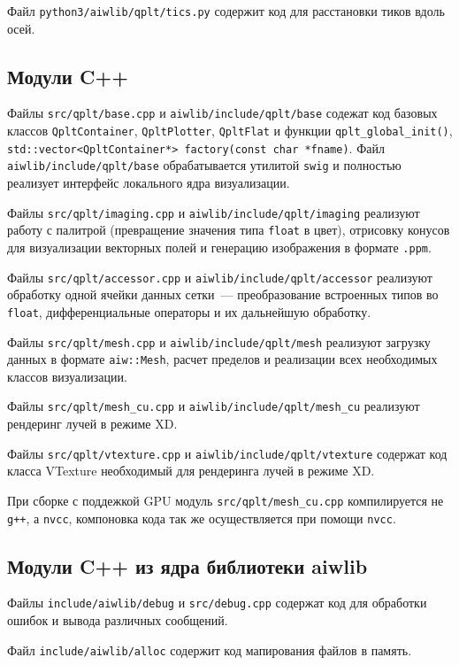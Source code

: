 \documentclass[12pt]{article}
\begin{document}
Файл \verb'python3/aiwlib/qplt/tics.py' содержит код для расстановки тиков вдоль осей.

\subsection{Модули C++}

Файлы \verb'src/qplt/base.cpp' и \verb'aiwlib/include/qplt/base' содежат код базовых классов \verb'QpltContainer',
\verb'QpltPlotter', \verb'QpltFlat' и функции \verb'qplt_global_init()', \verb'std::vector<QpltContainer*> factory(const char *fname)'.
Файл \verb'aiwlib/include/qplt/base' обрабатывается утилитой \verb'swig' и полностью реализует интерфейс локального ядра визуализации. 

Файлы \verb'src/qplt/imaging.cpp' и \verb'aiwlib/include/qplt/imaging' реализуют работу с палитрой (превращение значения типа \verb'float' в цвет),
отрисовку конусов для визуализации векторных полей и генерацию изображения в формате \verb'.ppm'.

Файлы \verb'src/qplt/accessor.cpp' и \verb'aiwlib/include/qplt/accessor' реализуют обработку одной ячейки данных сетки~--- преобразование
встроенных типов во \verb'float', дифференциальные операторы и их дальнейшую обработку. 

Файлы \verb'src/qplt/mesh.cpp' и \verb'aiwlib/include/qplt/mesh' реализуют загрузку данных в формате \verb'aiw::Mesh',
расчет пределов и реализации всех необходимых классов визуализации. 

Файлы \verb'src/qplt/mesh_cu.cpp' и \verb'aiwlib/include/qplt/mesh_cu' реализуют рендеринг лучей в режиме XD.

Файлы \verb'src/qplt/vtexture.cpp' и \verb'aiwlib/include/qplt/vtexture' содержат код класса VTexture необходимый для рендеринга лучей в режиме XD.

При сборке с поддежкой GPU модуль \verb'src/qplt/mesh_cu.cpp' компилируется не \verb'g++', а \verb'nvcc', компоновка кода так же осуществляется
при помощи \verb'nvcc'. 

\subsection{Модули C++ из ядра библиотеки aiwlib}
Файлы \verb'include/aiwlib/debug' и \verb'src/debug.cpp' содержат код для обработки ошибок и вывода различных сообщений.

Файл \verb'include/aiwlib/alloc' содержит код мапирования файлов в память.
\end{document}
